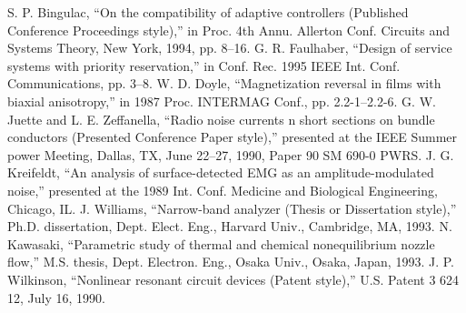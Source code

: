 \documentclass[letterpaper, 10 pt, conference]{ieeeconf}  %
\begin{document}
\begin{thebibliography}{99}
 S. P. Bingulac, “On the compatibility of adaptive controllers (Published Conference Proceedings style),” in Proc. 4th Annu. Allerton Conf. Circuits and Systems Theory, New York, 1994, pp. 8–16.
 G. R. Faulhaber, “Design of service systems with priority reservation,” in Conf. Rec. 1995 IEEE Int. Conf. Communications, pp. 3–8.
 W. D. Doyle, “Magnetization reversal in films with biaxial anisotropy,” in 1987 Proc. INTERMAG Conf., pp. 2.2-1–2.2-6.
 G. W. Juette and L. E. Zeffanella, “Radio noise currents n short sections on bundle conductors (Presented Conference Paper style),” presented at the IEEE Summer power Meeting, Dallas, TX, June 22–27, 1990, Paper 90 SM 690-0 PWRS.
 J. G. Kreifeldt, “An analysis of surface-detected EMG as an amplitude-modulated noise,” presented at the 1989 Int. Conf. Medicine and Biological Engineering, Chicago, IL.
 J. Williams, “Narrow-band analyzer (Thesis or Dissertation style),” Ph.D. dissertation, Dept. Elect. Eng., Harvard Univ., Cambridge, MA, 1993.
 N. Kawasaki, “Parametric study of thermal and chemical nonequilibrium nozzle flow,” M.S. thesis, Dept. Electron. Eng., Osaka Univ., Osaka, Japan, 1993.
 J. P. Wilkinson, “Nonlinear resonant circuit devices (Patent style),” U.S. Patent 3 624 12, July 16, 1990.






\end{thebibliography}
\end{document}
